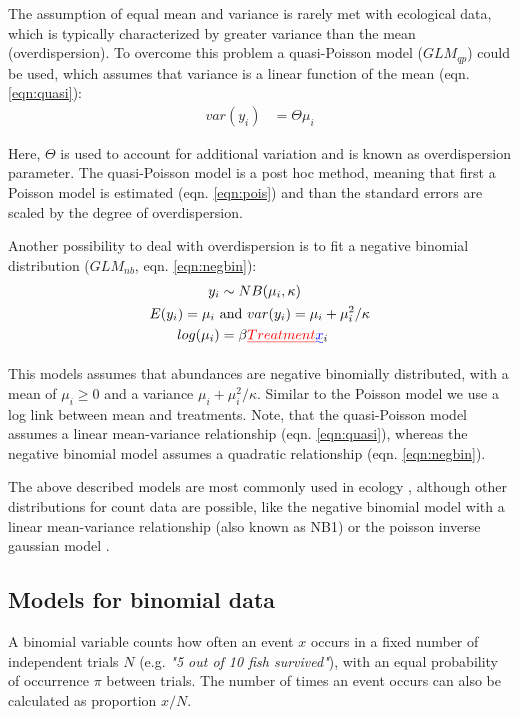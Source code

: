 \documentclass[twocolumn, natbib]{svjour3}
\providecommand{\DIFadd}[1]{{\protect\color{blue}\uwave{#1}}} %
\providecommand{\DIFdel}[1]{{\protect\color{red}\sout{#1}}}                      %
\providecommand{\DIFaddbegin}{} %
\providecommand{\DIFaddend}{} %
\providecommand{\DIFdelbegin}{} %
\providecommand{\DIFdelend}{} %
\begin{document}
The assumption of equal mean and variance is rarely met with ecological data, which is typically characterized by greater variance than the mean (overdispersion).
To overcome this problem a quasi-Poisson model ($GLM_{qp}$) could be used, which assumes that variance is a linear function of the mean (eqn. \ref{eqn:quasi}):
\begin{align}
  var(y_i) &= \Theta \mu_i  \label{eqn:quasi}
\end{align}

Here, $\Theta$ is used to account for additional variation and is known as overdispersion parameter.
The quasi-Poisson model is a post hoc method, meaning that first a Poisson model is estimated (eqn. \ref{eqn:pois}) and than the standard errors are scaled by the degree of overdispersion.

Another possibility to deal with overdispersion is to fit a negative binomial distribution ($GLM_{nb}$, eqn. \ref{eqn:negbin}):
\begin{align}
  y_i &\sim NB(\mu_i, \kappa) \nonumber  \\
  E(y_i) = \mu_i ~&\text{and}~var(y_i) = \mu_i + \mu_i^2 / \kappa \label{eqn:negbin} \\
  log(\mu_i) &= \beta \DIFdelbegin \DIFdel{Treatment}\DIFdelend \DIFaddbegin \DIFadd{x}\DIFaddend _i  \nonumber 
\end{align}

This models assumes that abundances are negative binomially distributed, with a mean of $\mu_i \ge 0$ and a variance $\mu_i + \mu_i^2 / \kappa$.
Similar to the Poisson model we use a log link between mean and treatments.
Note, that the quasi-Poisson model assumes a linear mean-variance relationship (eqn. \ref{eqn:quasi}), whereas the negative binomial model assumes a quadratic relationship (eqn. \ref{eqn:negbin}).

The above described models are most commonly used in ecology \citep{ver_hoef_quasi-poisson_2007}, although other distributions for count data are possible, like the negative binomial model with a linear mean-variance relationship (also known as NB1) or the poisson inverse gaussian model \citep{hilbe_modeling_2014}.


\subsection{Models for binomial data}
\label{ssec:bin}
A binomial variable counts how often an event $x$ occurs in a fixed number of independent trials $N$ (e.g. \emph{"5 out of 10 fish survived"}), with an equal probability of occurrence $\pi$ between trials.
The number of times an event occurs can also be calculated as proportion $x / N$.
\end{document}
